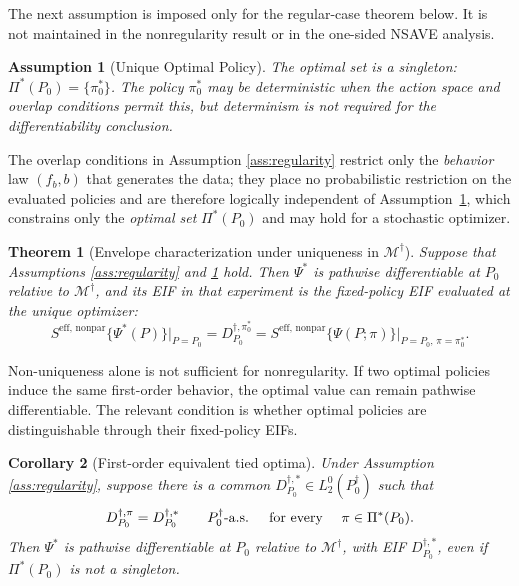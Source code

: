 \documentclass[12pt]{article}
\newtheorem{theorem}{Theorem}[section]
\newtheorem{corollary}[theorem]{Corollary}
\newtheorem{assumption}{Assumption}
\theoremstyle{remark}\newtheorem{remark}[theorem]{Remark}\theoremstyle{plain}
\newcommand{\EIF}{S^{\text{eff, nonpar}}}
\begin{document}
The next assumption is imposed only for the regular-case theorem
below.  It is not maintained in the nonregularity result or in the
one-sided NSAVE analysis.
\begin{assumption}[Unique Optimal Policy]\label{ass:deterministic_policy}
    The optimal set is a singleton:
    $\Pi^*(P_0)=\{\pi_0^*\}$.
    The policy $\pi_0^*$ may be deterministic when the action space and
    overlap conditions permit this, but determinism is not required for
    the differentiability conclusion.
\end{assumption}

The overlap conditions in Assumption \ref{ass:regularity} restrict only the
\emph{behavior} law $(f_b,b)$ that generates the data; they place no
probabilistic restriction on the evaluated policies and are therefore logically
independent of Assumption~\ref{ass:deterministic_policy}, which constrains only
the \emph{optimal set} $\Pi^*(P_0)$ and may hold for a stochastic optimizer.

\begin{theorem}[Envelope characterization under uniqueness in
$\mathcal M^\dagger$]
\label{thm:suff_cond_for_EIF_exp}
    Suppose that Assumptions \ref{ass:regularity} and
    \ref{ass:deterministic_policy} hold.
    Then $\Psi^*$ is pathwise differentiable at $P_0$ relative to
    $\mathcal M^\dagger$, and its EIF in that experiment is the
    fixed-policy EIF evaluated at the unique optimizer:
    \[
        \EIF\{\Psi^*(P)\}\big|_{P=P_0}
        =D_{P_0}^{\dagger,\pi_0^*}
        =\EIF\{\Psi(P;\pi)\}\big|_{P=P_0,\,\pi=\pi_0^*}.
    \]
\end{theorem}

Non-uniqueness alone is not sufficient for nonregularity.  If two
optimal policies induce the same first-order behavior, the optimal
value can remain pathwise differentiable.  The relevant condition is
whether optimal policies are distinguishable through their
fixed-policy EIFs.

\begin{corollary}[First-order equivalent tied optima]
\label{cor:equivalent_tied_optima}
    Under Assumption \ref{ass:regularity}, suppose there is a common
    $D_{P_0}^{\dagger,*}\in L_2^0(P_0^\dagger)$ such that
    \[
        D_{P_0}^{\dagger,\pi}
        =D_{P_0}^{\dagger,*}
        \qquad P_0^\dagger\text{-a.s. \quad for every } \quad
        \pi\in\Pi^*(P_0).
    \]
    Then $\Psi^*$ is pathwise differentiable at $P_0$ relative to
    $\mathcal M^\dagger$, with EIF
    $D_{P_0}^{\dagger,*}$, even if $\Pi^*(P_0)$ is not a singleton.
\end{corollary}
\end{document}
